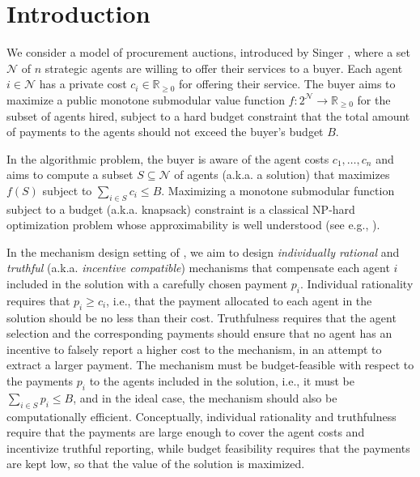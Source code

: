 \def\N{\mathcal{N}}
\def\reals{\mathbb{R}}
\def\nats{\mathbb{N}}
\def\eps{\varepsilon}

\section{Introduction}
\label{s:intro}

We consider a model of procurement auctions, introduced by Singer \cite{Singer10}, where a set $\N$ of $n$ strategic agents are willing to offer their services to a buyer. Each agent $i \in \N$ has a private cost $c_i \in \reals_{\geq 0}$ for offering their service. The buyer aims to maximize a public monotone submodular value function $f : 2^{\N} \to \reals_{\geq 0}$ for the subset of agents hired, subject to a hard budget constraint that the total amount of payments to the agents should not exceed the buyer's budget $B$. 

In the algorithmic problem, the buyer is aware of the agent costs $c_1, \ldots, c_n$ and aims to compute a subset $S \subseteq \N$ of agents (a.k.a. a solution) that maximizes $f(S)$ subject to $\sum_{i \in S} c_i \leq B$. Maximizing a monotone submodular function subject to a budget (a.k.a.  knapsack) constraint is a classical NP-hard optimization problem whose approximability is well understood (see e.g., \cite{NemhauserWF78,KhullerMN99,Sviri04,BadaDO19}). 

In the mechanism design setting of \cite{Singer10,Singer13}, we aim to design \emph{individually rational} and \emph{truthful} (a.k.a. \emph{incentive compatible}) mechanisms that compensate each agent $i$ included in the solution with a carefully chosen payment $p_i$. Individual rationality requires that $p_i \geq c_i$, i.e., that the payment allocated to each agent in the solution should be no less than their cost. Truthfulness requires that the agent selection and the corresponding payments should ensure that no agent has an incentive to falsely report a higher cost to the mechanism, in an attempt to extract a larger payment. 
%
The mechanism must be budget-feasible with respect to the payments $p_i$ to the agents included in the solution, i.e., it must be $\sum_{i\in S} p_i \leq B$, and in the ideal case, the mechanism should also be computationally efficient.   
%
Conceptually, individual rationality and truthfulness require that the payments are large enough to cover the agent costs and incentivize truthful reporting, while budget feasibility requires that the payments are kept low, so that the value of the solution is maximized. 


